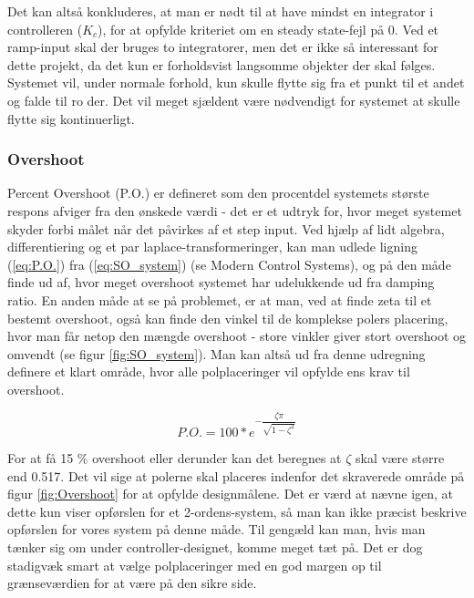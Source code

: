Det kan altså konkluderes, at man er nødt til at have mindst en integrator i controlleren ($K_{c}$), for at opfylde kriteriet om en steady state-fejl på 0. Ved et ramp-input skal der bruges to integratorer, men det er ikke så interessant for dette projekt, da det kun er forholdsvist langsomme objekter der skal følges. Systemet vil, under normale forhold, kun skulle flytte sig fra et punkt til et andet og falde til ro der. Det vil meget sjældent være nødvendigt for systemet at skulle flytte sig kontinuerligt.

\subsubsection{Overshoot}

Percent Overshoot (P.O.) er defineret som den procentdel systemets største respons afviger fra den ønskede værdi - det er et udtryk for, hvor meget systemet skyder forbi målet når det påvirkes af et step input. Ved hjælp af lidt algebra, differentiering og et par laplace-transformeringer, kan man udlede ligning (\ref{eq:P.O.}) fra (\ref{eq:SO_system}) (se Modern Control Systems\cite{ModernControlSystem}), og på den måde finde ud af, hvor meget overshoot systemet har udelukkende ud fra damping ratio. En anden måde at se på problemet, er at man, ved at finde zeta til et bestemt overshoot, også kan finde den vinkel til de komplekse polers placering, hvor man får netop den mængde overshoot - store vinkler giver stort overshoot og omvendt (se figur \ref{fig:SO_system}). Man kan altså ud fra denne udregning definere et klart område, hvor alle polplaceringer vil opfylde ens krav til overshoot. 

\begin{equation}\label{eq:P.O.}
P.O.=100*e^{-\dfrac{\zeta\pi}{\sqrt{1-\zeta^2}}}
\end{equation}

For at få 15 $\%$ overshoot eller derunder kan det beregnes at $\zeta$ skal være større end 0.517. Det vil sige at polerne skal placeres indenfor det skraverede område på figur \ref{fig:Overshoot} for at opfylde designmålene. Det er værd at nævne igen, at dette kun viser opførslen for et 2-ordens-system, så man kan ikke præcist beskrive opførslen for vores system på denne måde. Til gengæld kan man, hvis man tænker sig om under controller-designet, komme meget tæt på. Det er dog stadigvæk smart at vælge polplaceringer med en god margen op til grænseværdien for at være på den sikre side.

